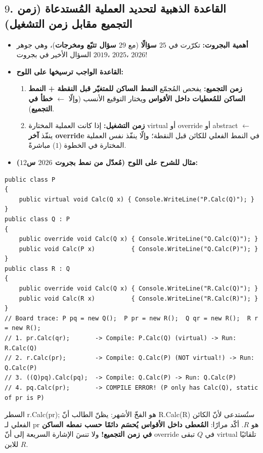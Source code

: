 \documentclass[14pt]{extarticle}
\begin{document}
\filbreak
\subsection*{$9$. القاعدة الذهبية لتحديد العملية المُستدعاة (زمن التجميع مقابل زمن التشغيل)}
\begin{itemize}[itemsep=0.25em]
    \item \textbf{أهمية البجروت:} تكرّرت في \textbf{$25$ سؤالًا} (مع \textbf{$29$ سؤال تتبّع ومخرجات})، وهي جوهر السؤال الأخير في بجروت $2019$، $2025$، $2026$!
    \item \textbf{القاعدة الواجب ترسيخها على اللوح:}
    \begin{enumerate}
        \item \textbf{زمن التجميع:} يفحص المُجمّع \textbf{النمط الساكن للمتغيّر قبل النقطة + النمط الساكن للمُعطيات داخل الأقواس} ويختار التوقيع الأنسب (وإلّا $\leftarrow$ \textbf{خطأ في التجميع}).
        \item \textbf{زمن التشغيل:} إذا كانت العملية المختارة \textenglish{virtual} أو \textenglish{override} أو \textenglish{abstract} $\leftarrow$ ينفّذ \textbf{آخر \textenglish{override}} في النمط الفعلي للكائن قبل النقطة؛ وإلّا ينفّذ نفس العملية المختارة في الخطوة ($1$) مباشرةً.
    \end{enumerate}
    \item \textbf{مثال للشرح على اللوح (مُعدّل من نمط بجروت $2026$ س$12$):}
\end{itemize}
\begin{boxCode}
\begin{english}
\begin{verbatim}
public class P
{
    public virtual void Calc(Q x) { Console.WriteLine("P.Calc(Q)"); }
}
public class Q : P
{
    public override void Calc(Q x) { Console.WriteLine("Q.Calc(Q)"); }
    public void Calc(P x)          { Console.WriteLine("Q.Calc(P)"); }
}
public class R : Q
{
    public override void Calc(Q x) { Console.WriteLine("R.Calc(Q)"); }
    public void Calc(R x)          { Console.WriteLine("R.Calc(R)"); }
}
// Board trace: P pq = new Q();  P pr = new R();  Q qr = new R();  R r = new R();
// 1. pr.Calc(qr);       -> Compile: P.Calc(Q) (virtual) -> Run: R.Calc(Q)
// 2. r.Calc(pr);        -> Compile: Q.Calc(P) (NOT virtual!) -> Run: Q.Calc(P)
// 3. ((Q)pq).Calc(pq);  -> Compile: Q.Calc(P) -> Run: Q.Calc(P)
// 4. pq.Calc(pr);       -> COMPILE ERROR! (P only has Calc(Q), static of pr is P)
\end{verbatim}
\end{english}
\end{boxCode}
\begin{boxWarning}
السطر \textenglish{r.Calc(pr);} هو الفخّ الأشهر: يظنّ الطالب أنّ \textenglish{R.Calc(R)} ستُستدعى لأنّ الكائن الفعلي لـ \textenglish{pr} هو $R$. أكّد مرارًا: \textbf{المُعطى داخل الأقواس يُحسَم دائمًا حسب نمطه الساكن في زمن التجميع!} ولا تنسَ الإشارة السريعة إلى أنّ \textenglish{override} في $Q$ تبقى \textenglish{virtual} تلقائيًا للابن $R$.
\end{boxWarning}
\end{document}
